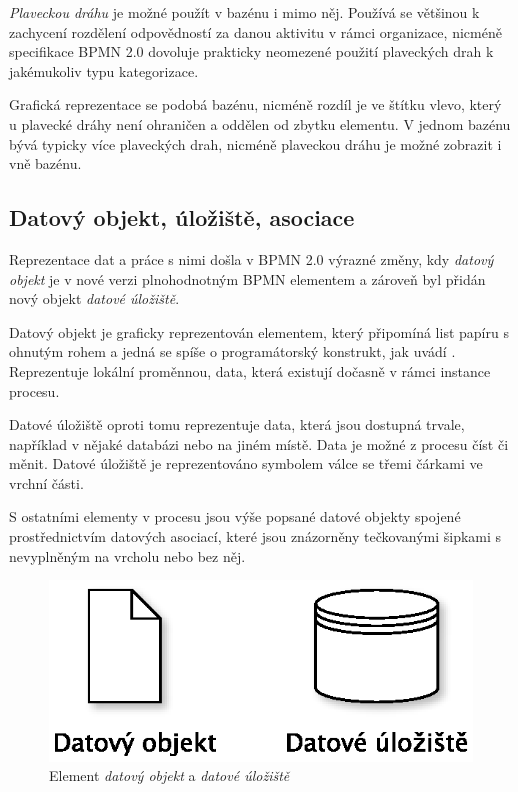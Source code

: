 \textit{Plaveckou dráhu} je možné použít v bazénu i mimo něj. Používá se většinou k zachycení rozdělení odpovědností za danou aktivitu v rámci organizace, nicméně specifikace BPMN 2.0 dovoluje prakticky neomezené použití plaveckých drah k jakémukoliv typu kategorizace. \cite{Silver2011}

Grafická reprezentace se podobá bazénu, nicméně rozdíl je ve štítku vlevo, který u plavecké dráhy není ohraničen a oddělen od zbytku elementu. V jednom bazénu bývá typicky více plaveckých drah, nicméně plaveckou dráhu je možné zobrazit i vně bazénu.

\subsection{Datový objekt, úložiště, asociace}
Reprezentace dat a práce s nimi došla v BPMN 2.0 výrazné změny, kdy \textit{datový objekt} je v nové verzi plnohodnotným BPMN elementem a zároveň byl přidán nový objekt \textit{datové úložiště}.

Datový objekt je graficky reprezentován elementem, který připomíná list papíru s ohnutým rohem a jedná se spíše o programátorský konstrukt, jak uvádí \cite{Silver2011}. Reprezentuje lokální proměnnou, data, která existují dočasně v rámci instance procesu.

Datové úložiště oproti tomu reprezentuje data, která jsou dostupná trvale, například v nějaké databázi nebo na jiném místě. Data je možné z procesu číst či měnit. Datové úložiště je reprezentováno symbolem válce se třemi čárkami ve vrchní části.

S ostatními elementy v procesu jsou výše popsané datové objekty spojené prostřednictvím datových asociací, které jsou znázorněny tečkovanými šipkami s nevyplněným  na vrcholu nebo bez něj.

\begin{figure}[H]\centering
\includegraphics[scale=0.7]{obrazky/data-object-store}
\caption{Element \textit{datový objekt} a \textit{datové úložiště}}
\label{fig:datove_objekty}
\end{figure}

